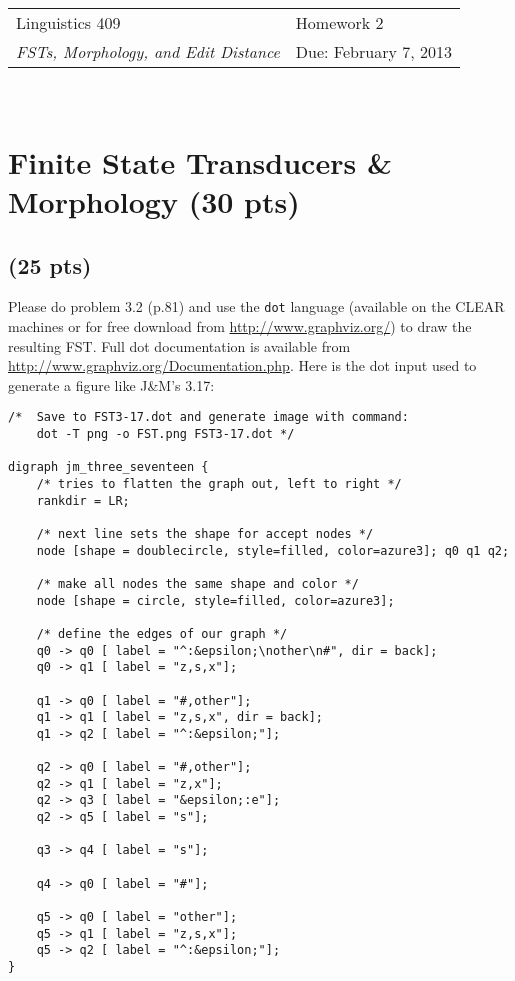 \documentclass[11pt]{article}
\begin{document}
\noindent
\begin{tabularx}{\textwidth}{X>{\raggedleft}X}
       \noindent Linguistics 409 & Homework 2\tabularnewline
       \noindent \emph{FSTs, Morphology, and Edit Distance} & Due: February 7, 2013\\
\end{tabularx}\\

\section{Finite State Transducers \& Morphology (30 pts)}

\subsection{(25 pts)} Please do problem 3.2 (p.81) and use the \texttt{dot} language (available on the CLEAR machines or for free download from \url{http://www.graphviz.org/}) to draw the resulting FST.  Full dot documentation is available from \url{http://www.graphviz.org/Documentation.php}.  Here is the dot input used to generate a figure like J\&M's 3.17:
     
     \begin{verbatim}
/*  Save to FST3-17.dot and generate image with command:
    dot -T png -o FST.png FST3-17.dot */

digraph jm_three_seventeen {
    /* tries to flatten the graph out, left to right */
    rankdir = LR;

    /* next line sets the shape for accept nodes */
    node [shape = doublecircle, style=filled, color=azure3]; q0 q1 q2;

    /* make all nodes the same shape and color */
    node [shape = circle, style=filled, color=azure3];

    /* define the edges of our graph */
    q0 -> q0 [ label = "^:&epsilon;\nother\n#", dir = back];
    q0 -> q1 [ label = "z,s,x"];

    q1 -> q0 [ label = "#,other"];
    q1 -> q1 [ label = "z,s,x", dir = back];
    q1 -> q2 [ label = "^:&epsilon;"];

    q2 -> q0 [ label = "#,other"];
    q2 -> q1 [ label = "z,x"];
    q2 -> q3 [ label = "&epsilon;:e"];
    q2 -> q5 [ label = "s"];

    q3 -> q4 [ label = "s"];

    q4 -> q0 [ label = "#"];

    q5 -> q0 [ label = "other"];
    q5 -> q1 [ label = "z,s,x"];
    q5 -> q2 [ label = "^:&epsilon;"];
}
     \end{verbatim}
     
\end{document}
